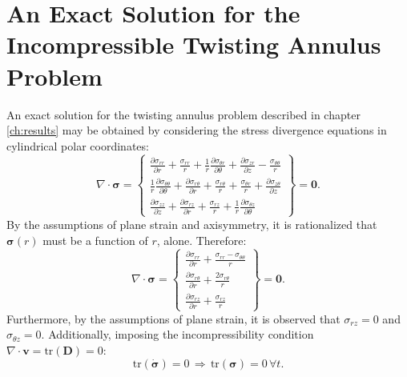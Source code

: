 \chapter{An Exact Solution for the Incompressible Twisting Annulus Problem}

An exact solution for the twisting annulus problem described in chapter \ref{ch:results} may be obtained by considering the stress divergence equations in cylindrical polar coordinates:
\begin{equation}
  \nabla \cdot \boldsymbol{\sigma} = \left\{ \begin{array}{c} \frac{\partial \sigma_{rr}}{\partial r} + \frac{\sigma_{rr}}{r} + \frac{1}{r} \frac{\partial \sigma_{\theta r}}{\partial \theta} + \frac{\partial \sigma_{z r}}{\partial z} - \frac{\sigma_{\theta \theta}}{r} \\
    \frac{1}{r} \frac{\partial \sigma_{\theta \theta}}{\partial \theta} + \frac{\partial \sigma_{r\theta}}{\partial r} + \frac{\sigma_{r\theta}}{r} + \frac{\sigma_{\theta r}}{r} + \frac{\partial \sigma_{z \theta}}{\partial z} \\
    \frac{\partial \sigma_{z z}}{\partial z} + \frac{\partial \sigma_{r z}}{\partial r} + \frac{\sigma_{r z}}{r} + \frac{1}{r} \frac{\partial \sigma_{\theta z}}{\partial \theta} \end{array} \right\} = \bm{0}.
\end{equation}
By the assumptions of plane strain and axisymmetry, it is rationalized that $\boldsymbol{\sigma} (r)$ must be a function of $r$, alone. Therefore:
\begin{equation}
  \nabla \cdot \boldsymbol{\sigma} = \left\{ \begin{array}{c} \frac{\partial \sigma_{rr}}{\partial r} + \frac{\sigma_{rr} - \sigma_{\theta \theta}}{r} \\
    \frac{\partial \sigma_{r\theta}}{\partial r} + \frac{2 \sigma_{r\theta}}{r} \\
    \frac{\partial \sigma_{r z}}{\partial r} + \frac{\sigma_{r z}}{r} \end{array} \right\} = \bm{0}.
\end{equation}
Furthermore, by the assumptions of plane strain, it is observed that $\sigma_{rz} = 0$ and $\sigma_{\theta z} = 0$. Additionally, imposing the incompressibility condition $\nabla \cdot \bm{v} = \text{tr} (\bm{D}) = 0$:
\begin{equation}
  \text{tr} (\dot{\boldsymbol{\sigma}}) = 0 \, \Rightarrow \, \text{tr} (\boldsymbol{\sigma}) = 0 \, \forall t.
\end{equation}
